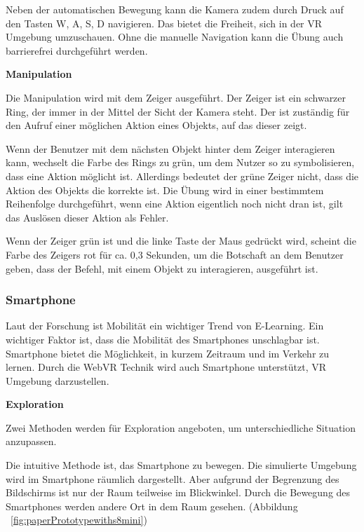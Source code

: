   Neben der automatischen Bewegung kann die Kamera zudem durch Druck auf den Tasten W, A, S, D navigieren. Das bietet die Freiheit, sich in der VR Umgebung umzuschauen. Ohne die manuelle Navigation kann die Übung auch barrierefrei durchgeführt werden.
  
  \vspace{1em}
  \noindent
  \textbf{Manipulation}
  \vspace{1em}
  
  \noindent
  Die Manipulation wird mit dem Zeiger ausgeführt. Der Zeiger ist ein schwarzer Ring, der immer in der Mittel der Sicht der Kamera steht. Der ist zuständig für den Aufruf einer möglichen Aktion eines Objekts, auf das dieser zeigt.
  
  Wenn der Benutzer mit dem nächsten Objekt hinter dem Zeiger interagieren kann, wechselt die Farbe des Rings zu grün, um dem Nutzer so zu symbolisieren, dass eine Aktion möglicht ist. Allerdings bedeutet der grüne Zeiger nicht, dass die Aktion des Objekts die korrekte ist. Die Übung wird in einer bestimmtem Reihenfolge durchgeführt, wenn eine Aktion eigentlich noch nicht dran ist, gilt das Auslösen dieser Aktion als Fehler.
  
  Wenn der Zeiger grün ist und die linke Taste der Maus gedrückt wird, scheint die Farbe des Zeigers rot für ca. 0,3 Sekunden, um die Botschaft an dem Benutzer geben, dass der Befehl, mit einem Objekt zu interagieren, ausgeführt ist. 
  
 \subsubsection{Smartphone}
 Laut der Forschung ist Mobilität ein wichtiger Trend von E-Learning. Ein wichtiger Faktor ist, dass die Mobilität des Smartphones unschlagbar ist. Smartphone bietet die Möglichkeit, in kurzem Zeitraum und im Verkehr zu lernen. Durch die WebVR Technik wird auch Smartphone unterstützt, VR Umgebung darzustellen.
 
  \vspace{1em}
  \noindent
  \textbf{Exploration}
  \vspace{1em}
  
  \noindent
  Zwei Methoden werden für Exploration angeboten, um unterschiedliche Situation anzupassen.
  
  Die intuitive Methode ist, das Smartphone zu bewegen. Die simulierte Umgebung wird im Smartphone räumlich dargestellt. Aber aufgrund der Begrenzung des Bildschirms ist nur der Raum teilweise im Blickwinkel. Durch die Bewegung des Smartphones werden andere Ort in dem Raum gesehen. (Abbildung ~\ref{fig:paperPrototypewiths8mini})

